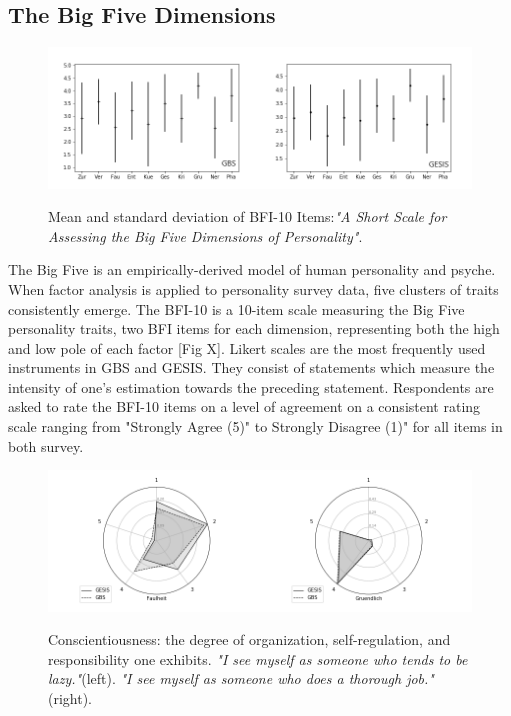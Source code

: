 \subsection{The Big Five Dimensions}

\begin{figure}[ht]
	\begin{center}
		\includegraphics[scale=0.55,angle=0]{fig/std_figure}
		\label{std}
		\caption{Mean and standard deviation of BFI-10 Items:\textit{"A Short Scale for Assessing the Big Five Dimensions of Personality"}.}
	\end{center}
\end{figure}

The Big Five is an empirically-derived model of human personality and psyche. When factor analysis is applied to personality survey data, five clusters of traits consistently emerge. The BFI-10 is a 10-item scale measuring the Big Five personality traits, two BFI items for each dimension, representing both the high and low pole of each factor [Fig X]. Likert scales are the most frequently used instruments in GBS and GESIS. They consist of statements which measure the intensity of one's estimation towards the preceding statement. Respondents are asked to rate the BFI-10 items on a level of agreement on a consistent rating scale ranging from "Strongly Agree (5)" to Strongly Disagree (1)" for all items in both survey.

\begin{figure}[ht]
	\begin{center}
		\includegraphics[scale=0.55,angle=0]{fig/Conscientiousness_figure}
		\label{Conscientiousness}
		\caption{Conscientiousness: the degree of organization, self-regulation, and responsibility one exhibits. \textit{"I see myself as someone who tends to be lazy."}(left). \textit{"I see myself as someone who does a thorough job."}(right).}
	\end{center}
\end{figure}

